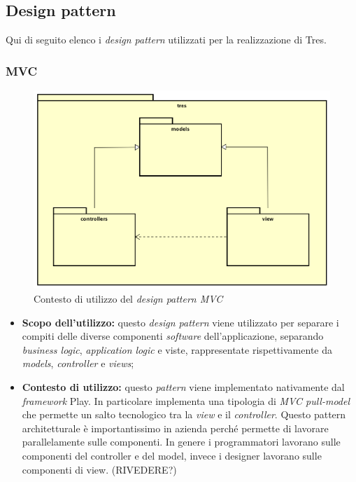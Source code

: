 \subsection{Design pattern}
Qui di seguito elenco i \emph{design pattern} utilizzati per la realizzazione di Tres.
\subsubsection{MVC}
\begin{figure}[h]
\centering
\includegraphics[scale=0.20]{immagini/mvc}
\caption{Contesto di utilizzo del \emph{design pattern MVC}}
\label{fig:pattern-mvc}
\end{figure}
\begin{itemize}
\item\textbf{Scopo dell'utilizzo:} questo \emph{design pattern} viene utilizzato per separare i compiti delle diverse componenti \emph{software} dell'applicazione, separando \emph{business logic}, \emph{application logic} e viste, rappresentate rispettivamente da \emph{models}, \emph{controller} e \emph{views};
\item \textbf{Contesto di utilizzo:} questo \emph{pattern} viene implementato nativamente dal \emph{framework} Play. In particolare implementa una tipologia di \emph{MVC pull-model} che permette un salto tecnologico tra la \emph{view} e il \emph{controller}. Questo pattern architetturale è importantissimo in azienda perché permette di lavorare parallelamente sulle componenti. In genere i programmatori lavorano sulle componenti del controller e del model, invece i designer lavorano sulle componenti di view. (RIVEDERE?)
\end{itemize}
